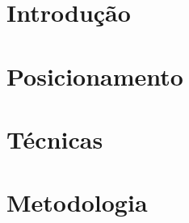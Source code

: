 \documentclass[a4paper,12pt,oneside,openany]{book}
\begin{document}
\frontmatter
\thispagestyle{empty}



\pagebreak



     \tableofcontents
\listoffigures
\listoftables

\mainmatter
\cleardoublepage
\chapter{Introdução}
\label{introducao}


\chapter{Posicionamento}
\label{posicao}


\chapter{Técnicas}
\label{tecnicas}


\chapter{Metodologia}
\label{metodologia}


\end{document}

